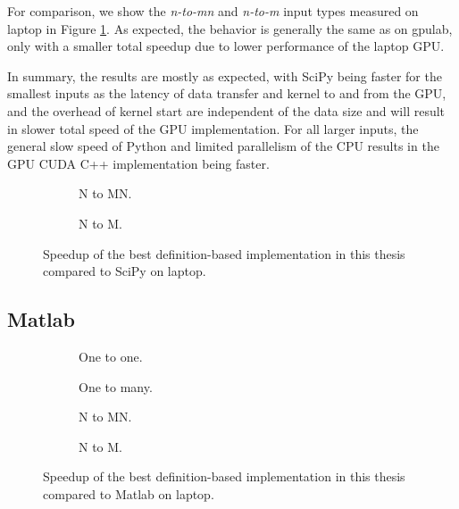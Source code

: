 For comparison, we show the \textit{n-to-mn} and \textit{n-to-m} input types measured on laptop in Figure \ref{fig:scipy_speedup}. As expected, the behavior is generally the same as on gpulab, only with a smaller total speedup due to lower performance of the laptop GPU.

In summary, the results are mostly as expected, with SciPy being faster for the smallest inputs as the latency of data transfer and kernel to and from the GPU, and the overhead of kernel start are independent of the data size and will result in slower total speed of the GPU implementation. For all larger inputs, the general slow speed of Python and limited parallelism of the CPU results in the GPU CUDA C++ implementation being faster.


\begin{figure}[ht]
	\centering	

	\begin{subfigure}{0.4\textwidth}
		\centering
		\def\svgwidth{\textwidth}
		
		\caption{N to MN.}
	\end{subfigure}
	\begin{subfigure}{0.4\textwidth}
		\centering
		\def\svgwidth{\textwidth}
		
		\caption{N to M.}
	\end{subfigure}
	\caption{Speedup of the best definition-based implementation in this thesis compared to SciPy on laptop.}
	\label{fig:scipy_speedup}
\end{figure}

\subsection{Matlab}

\begin{figure}[ht]
	\centering	
	\begin{subfigure}{0.4\textwidth}
		\centering
		\def\svgwidth{\textwidth}
		
		\caption{One to one.}
		\label{fig:matlab_one_to_one}
	\end{subfigure}
	\begin{subfigure}{0.4\textwidth}
		\centering
		\def\svgwidth{\textwidth}
		
		\caption{One to many.}
	\end{subfigure}
	\begin{subfigure}{0.4\textwidth}
		\centering
		\def\svgwidth{\textwidth}
		
		\caption{N to MN.}
	\end{subfigure}
	\begin{subfigure}{0.4\textwidth}
		\centering
		\def\svgwidth{\textwidth}
		
		\caption{N to M.}

	\end{subfigure}
	\caption{Speedup of the best definition-based implementation in this thesis compared to Matlab on laptop.}
	\label{fig:matlab_speedup}
\end{figure}

